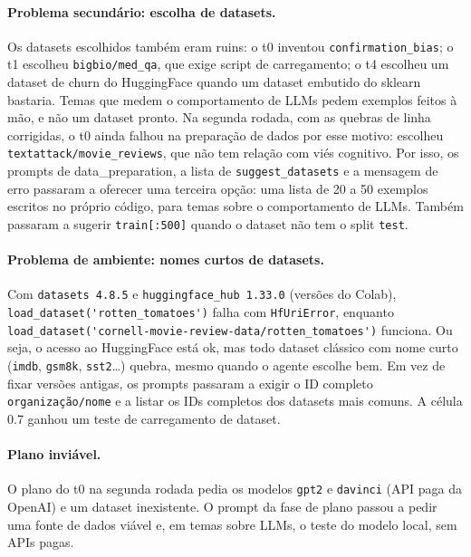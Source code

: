 \documentclass[11pt,a4paper]{article}
\newcommand{\fase}[1]{\textsf{#1}}
\begin{document}
\paragraph{Problema secundário: escolha de datasets.} Os datasets escolhidos também eram
ruins: o t0 inventou \texttt{confirmation\_bias}; o t1 escolheu \texttt{bigbio/med\_qa},
que exige script de carregamento; o t4 escolheu um dataset de churn do HuggingFace quando um
dataset embutido do sklearn bastaria. Temas que medem o comportamento de LLMs pedem
exemplos feitos à mão, e não um dataset pronto. Na segunda rodada, com as quebras de linha
corrigidas, o t0 ainda falhou na preparação de dados por esse motivo: escolheu
\texttt{textattack/movie\_reviews}, que não tem relação com viés cognitivo. Por isso, os prompts de
\fase{data\_preparation}, a lista de \texttt{suggest\_datasets} e a mensagem de erro passaram a
oferecer uma terceira opção: uma lista de 20 a 50 exemplos escritos no próprio código, para temas
sobre o comportamento de LLMs. Também passaram a sugerir \texttt{train[:500]} quando o dataset não
tem o split \texttt{test}.

\paragraph{Problema de ambiente: nomes curtos de datasets.} Com \texttt{datasets 4.8.5} e
\texttt{huggingface\_hub 1.33.0} (versões do Colab), \verb|load_dataset('rotten_tomatoes')| falha com
\texttt{HfUriError}, enquanto \verb|load_dataset('cornell-movie-review-data/rotten_tomatoes')| funciona. Ou seja,
o acesso ao HuggingFace está ok, mas todo dataset clássico com nome curto (\texttt{imdb}, \texttt{gsm8k},
\texttt{sst2}\ldots) quebra, mesmo quando o agente escolhe bem. Em vez de fixar versões antigas, os prompts
passaram a exigir o ID completo \texttt{organização/nome} e a listar os IDs completos dos datasets mais
comuns. A célula 0.7 ganhou um teste de carregamento de dataset.

\paragraph{Plano inviável.} O plano do t0 na segunda rodada pedia os modelos \texttt{gpt2} e
\texttt{davinci} (API paga da OpenAI) e um dataset inexistente. O prompt da fase de plano passou a pedir
uma fonte de dados viável e, em temas sobre LLMs, o teste do modelo local, sem APIs pagas.
\end{document}
